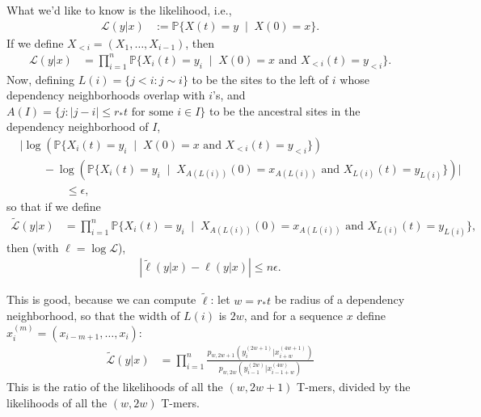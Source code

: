 \documentclass{article}
\renewcommand{\P}{\mathbb{P}}
\newcommand{\st}{\colon}  %
\newcommand{\given}{\;\mid\;}
\newcommand{\like}{\mathcal L}
\newcommand{\loglike}{\ell}
\newcommand{\alike}{\widetilde{\like}}
\newcommand{\aloglike}{\widetilde{\loglike}}
\theoremstyle{plain}
\theoremstyle{definition}
\begin{document}
What we'd like to know is the likelihood, i.e.,
\begin{align}
    \like(y|x)
    &:=
    \P\{ X(t) = y \given X(0) = x \} .
\end{align}
If we define $X_{<i}=(X_1, \ldots, X_{i-1})$, then
\begin{align}
    \like(y|x)
    &=
    \prod_{i=1}^n
    \P\{ X_i(t) = y_i \given X(0) = x \text{ and } X_{<i}(t) = y_{<i} \} .
\end{align}
Now, defining $L(i) = \{ j < i \st j \sim i \}$
to be the sites to the left of $i$ whose dependency neighborhoods overlap with $i$'s,
and $A(I) = \{ j \st |j-i| \le r_*t \text{ for some } i \in I\}$
to be the ancestral sites in the dependency neighborhood of $I$,
\begin{align}
&\big|
    \log( \P\{ X_i(t) = y_i \given X(0) = x \text{ and } X_{<i}(t) = y_{<i} \} ) \\
& \qquad {} -
    \log( \P\{ X_i(t) = y_i \given X_{A(L(i))}(0) = x_{A(L(i))} \text{ and } X_{L(i)}(t) = y_{L(i)} \} )
 \big| \\
&\qquad \qquad \le
    \epsilon ,
\end{align}
so that if we define
\begin{align}
    \alike(y|x)
    &=
    \prod_{i=1}^n
    \P\{ X_i(t) = y_i \given X_{A(L(i))}(0) = x_{A(L(i))} \text{ and } X_{L(i)}(t) = y_{L(i)} \} ,
\end{align}
then (with $\loglike = \log \like$),
\begin{align}
    \left| \aloglike(y|x) - \loglike(y|x) \right|
    \le n \epsilon .
\end{align}


This is good, because we can compute $\aloglike$:
let $w=r_*t$ be radius of a dependency neighborhood,
so that the width of $L(i)$ is $2w$,
and for a sequence $x$ define $x^{(m)}_i = (x_{i-m+1}, \ldots, x_i)$:
\begin{align}
    \alike(y|x)
    &=
    \prod_{i=1}^n
    \frac{
        p_{w,2w+1}(y^{(2w+1)}_i|x^{(4w+1)}_{i+w})
    }{
        p_{w,2w}(y^{(2w)}_{i-1}|x^{(4w)}_{i-1+w})
    }
\end{align}
This is the ratio of the likelihoods of all the $(w,2w+1)$ T-mers,
divided by the likelihoods of all the $(w,2w)$ T-mers.
\end{document}
